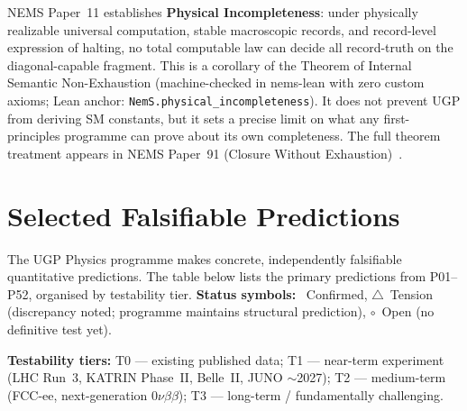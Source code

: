 \documentclass[11pt]{article}
\begin{document}
NEMS Paper~11 establishes \textbf{Physical Incompleteness}: under physically
realizable universal computation, stable macroscopic records, and record-level
expression of halting, no total computable law can decide all record-truth on
the diagonal-capable fragment.  This is a corollary of the Theorem of Internal
Semantic Non-Exhaustion (machine-checked in nems-lean with zero custom axioms;
Lean anchor: \texttt{NemS.physical\_incompleteness}).  It does not prevent
UGP from deriving SM constants, but it sets a precise limit on what any
first-principles programme can prove about its own completeness.  The full
theorem treatment appears in NEMS Paper~91 (Closure Without Exhaustion)~\cite{SpivackNEMSHub}.

\appendix

\section{Selected Falsifiable Predictions}
\label{app:predictions}

The UGP Physics programme makes concrete, independently falsifiable quantitative
predictions.  The table below lists the primary predictions from P01--P52,
organised by testability tier.
\textbf{Status symbols:} \checkmark~Confirmed,
$\triangle$~Tension (discrepancy noted; programme maintains structural
prediction), $\circ$~Open (no definitive test yet).

\medskip
\noindent\textbf{Testability tiers:}
T0 — existing published data;
T1 — near-term experiment (LHC Run~3, KATRIN Phase~II, Belle~II, JUNO $\sim$2027);
T2 — medium-term (FCC-ee, next-generation 0$\nu\beta\beta$);
T3 — long-term / fundamentally challenging.
\end{document}
